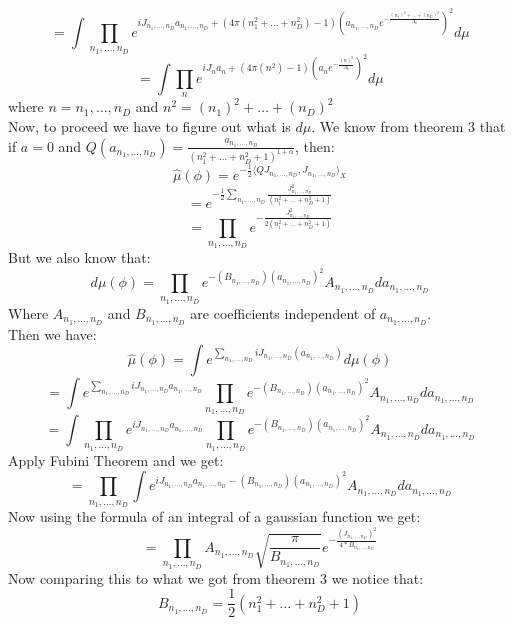 \documentclass{article}
\theoremstyle{definition}
\begin{document}
$$
=\int \prod_{n_1,\ldots,n_D}e^{iJ_{n_1,\ldots,n_D} a_{n_1,\ldots,n_D} +
\left(4\pi(n_1^2+\ldots+n_D^2)-1\right) \left(a_{n_1,\ldots,n_D} e^{-\frac{(n_1)^2+\ldots+(n_D)^2}{\Lambda_k}}\right)^2}d\mu
$$
$$
=\int \prod_{n}e^{iJ_{n} a_{n} +
\left(4\pi(n^2)-1\right) \left(a_{n} e^{-\frac{(n)^2}{\Lambda_k}}\right)^2}d\mu
$$
where $n=n_1,\ldots,n_D$ and $n^2 = (n_1)^2+\ldots+(n_D)^2$\\
Now, to proceed we have to figure out what is $d\mu$.
We know from theorem 3 that if $a=0$ and $Q(a_{n_1,..., n_D}) = \frac{a_{n_1,..., n_D}}{(n_1^2 + \ldots + n_D^2 + 1)^{1+\alpha}}$, then:
\[
\hat{\mu}(\phi)=e^{-\frac{1}{2}\langle Q J_{n_1,\ldots,n_D}, J_{n_1,\ldots,n_D} \rangle_{X}}
\]
\[
=e^{-\frac{1}{2}\sum_{n_1,\ldots, n_D} \frac{J_{n_1,\ldots, n_D}^2}{(n_1^2 + \ldots + n_D^2 + 1)} }
\]
\[
=\prod_{n_1,\ldots,n_D}e^{- \frac{J_{n_1,\ldots, n_D}^2}{2(n_1^2 + \ldots + n_D^2 + 1)} }
\]
But we also know that:
\[
d\mu(\phi)=\prod_{n_1,\ldots,n_D}e^{-(B_{n_1,\ldots,n_D})(a_{n_1,\ldots,n_D})^2}A_{n_1,\ldots,n_D} da_{n_1,\ldots,n_D}
\]
Where $A_{n_1,\ldots,n_D}$ and $B_{n_1,\ldots,n_D}$ are coefficients independent of $a_{n_1,\ldots,n_D}$.\\
Then we have:
\[
\hat{\mu}(\phi)=\int e^{\sum_{n_1,\ldots,n_D}iJ_{n_1,\ldots,n_D} (a_{n_1,\ldots,n_D})}d\mu(\phi)
\]
\[
=\int e^{\sum_{n_1,\ldots,n_D}iJ_{n_1,\ldots,n_D} a_{n_1,\ldots,n_D}}\prod_{n_1,\ldots,n_D}e^{-(B_{n_1,\ldots,n_D})(a_{n_1,\ldots,n_D})^2}A_{n_1,\ldots,n_D}da_{n_1,\ldots,n_D}
\]
\[
=\int \prod_{n_1,\ldots,n_D}e^{iJ_{n_1,\ldots,n_D} a_{n_1,\ldots,n_D}} \prod_{n_1,\ldots,n_D}e^{-(B_{n_1,\ldots,n_D})(a_{n_1,\ldots,n_D})^2}A_{n_1,\ldots,n_D}da_{n_1,\ldots,n_D}
\]
Apply Fubini Theorem and we get:
\[
= \prod_{n_1,\ldots,n_D}\int e^{iJ_{n_1,\ldots,n_D} a_{n_1,\ldots,n_D}-(B_{n_1,\ldots,n_D})(a_{n_1,\ldots,n_D})^2} A_{n_1,\ldots,n_D}da_{n_1,\ldots,n_D}
\]
Now using the formula of an integral of a gaussian function we get:
\[
= \prod_{n_1,\ldots,n_D} A_{n_1,\ldots,n_D} \sqrt{\frac{\pi}{B_{n_1,\ldots,n_D} }} e^{-\frac{(J_{n_1,\ldots,n_D})^2}{4*B_{n_1,\ldots,n_D} }}
\]
Now comparing this to what we got from theorem 3 we notice that:
\[
B_{n_1,\ldots,n_D} = \frac{1}{2}\left(n_1^2+\ldots+n_D^2+1\right)
\]
\end{document}
